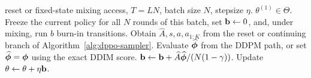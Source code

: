 



    







\begin{algorithm}[tbp]
    \caption{Vanilla Diffusion Policy Gradient}
    \begin{algorithmic}[1]
         reset or fixed-state mixing access, $T=LN$, batch size $N$, stepsize $\eta$.
         $\theta^{(1)}\in\Theta$.
            \STATE Freeze the current policy for all $N$ rounds of this batch, set $\mathbf{b}\gets0$, and, under mixing, run $b$ burn-in transitions.
                \STATE Obtain $\widehat A,s,a,a_{1:K}$ from the reset or continuing branch of Algorithm~\ref{alg:dppo-sampler}.
                \STATE Evaluate $\widehat{\boldsymbol{\phi}}$ from the DDPM path, or set $\widehat{\boldsymbol{\phi}}=\boldsymbol{\phi}$ using the exact DDIM score.
                \STATE $\mathbf{b}\gets\mathbf{b}+\widehat A\widehat{\boldsymbol{\phi}}/(N(1-\gamma))$.
            \ENDFOR
            \STATE Update $\theta\gets\theta+\eta\mathbf{b}$.
        \ENDFOR
    \end{algorithmic}
\label{alg:dppo-vanilla-pg}
\end{algorithm}

